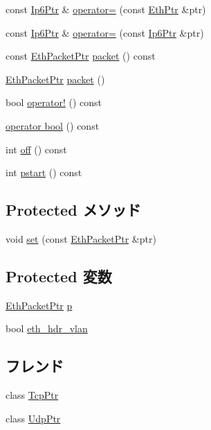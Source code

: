 \begin{DoxyCompactItemize}
const \hyperlink{classNet_1_1Ip6Ptr}{Ip6Ptr} \& \hyperlink{classNet_1_1Ip6Ptr_a3e72174b84b4802f753e4c42b0c207b5}{operator=} (const \hyperlink{classNet_1_1EthPtr}{EthPtr} \&ptr)
\item 
const \hyperlink{classNet_1_1Ip6Ptr}{Ip6Ptr} \& \hyperlink{classNet_1_1Ip6Ptr_a4f80dfc3261fbb886b014d16e991360d}{operator=} (const \hyperlink{classNet_1_1Ip6Ptr}{Ip6Ptr} \&ptr)
\item 
const \hyperlink{classRefCountingPtr}{EthPacketPtr} \hyperlink{classNet_1_1Ip6Ptr_a13e32a6fa7b2f1b41d1d8dc32d8fda9e}{packet} () const 
\item 
\hyperlink{classRefCountingPtr}{EthPacketPtr} \hyperlink{classNet_1_1Ip6Ptr_a549ac5c293e8047f1be38ca356e160da}{packet} ()
\item 
bool \hyperlink{classNet_1_1Ip6Ptr_ac8b1d32dbd52d431450c70b151cfa205}{operator!} () const 
\item 
\hyperlink{classNet_1_1Ip6Ptr_aa385aa18f5e42db5a415c25a90f4193d}{operator bool} () const 
\item 
int \hyperlink{classNet_1_1Ip6Ptr_a81fa7ab0c6e92d4496ee915a8a3705f9}{off} () const 
\item 
int \hyperlink{classNet_1_1Ip6Ptr_ae6fc8073bc02ff3fd03030e0936d56eb}{pstart} () const 
\end{DoxyCompactItemize}
\subsection*{Protected メソッド}
\begin{DoxyCompactItemize}
\item 
void \hyperlink{classNet_1_1Ip6Ptr_af1faec8f5ac9a74b80fa6ce84b17a7c6}{set} (const \hyperlink{classRefCountingPtr}{EthPacketPtr} \&ptr)
\end{DoxyCompactItemize}
\subsection*{Protected 変数}
\begin{DoxyCompactItemize}
\item 
\hyperlink{classRefCountingPtr}{EthPacketPtr} \hyperlink{classNet_1_1Ip6Ptr_a764b18a7236ca83fd4bd750516da7d09}{p}
\item 
bool \hyperlink{classNet_1_1Ip6Ptr_a0d4c03dd0e48319a9a4c5f4148c8a496}{eth\_\-hdr\_\-vlan}
\end{DoxyCompactItemize}
\subsection*{フレンド}
\begin{DoxyCompactItemize}
\item 
class \hyperlink{classNet_1_1Ip6Ptr_aaa26166329482f65ba88b88bb72b04ed}{TcpPtr}
\item 
class \hyperlink{classNet_1_1Ip6Ptr_ae00019f223a3b97d7f64791d15e438e5}{UdpPtr}
\end{DoxyCompactItemize}


